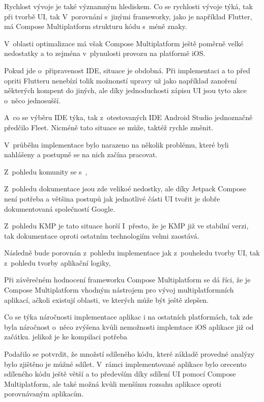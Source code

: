 Rychlost vývoje je také významným hlediskem. 
Co se rychlosti vývoje týká, tak při tvorbě UI, tak V~porovnání s~jinými frameworky, jako je například Flutter, má Compose Multiplatform strukturu kódu s~méně znaky.


V~oblasti optimalizace má však Compose Multiplatform ještě poměrně velké nedostatky a to zejména v~plynulosti provozu na 
platformě iOS.


Pokud jde o~připravenost IDE, situace je obdobná.  Při implementaci a to před
opriti Flutteru nenebízí tolik možnonstí upravy už jako  například zanoření některých kompent do jiných, ale díky jednoduchosti
zápisu UI jsou tyto akce o~něco jednosušší.

A~co se výběru IDE týka, tak z~otestovaných IDE Android Studio jednoznačně předčilo Fleet. Nicméně tato situace se může, 
taktéž rychle změnit.

V~průběhu implementace bylo narazeno na několik problému, které byli nahlášeny a postupně se na nich začína pracovat.

Z~pohledu komunity se s~,


Z~pohledu dokumentace jsou zde velikoé nedostky, ale díky Jetpack Compose není potřeba a většina postupů jak jednotlivé části 
UI tvořit je dobře dokumentovaná společností Google. 

Z~pohledu KMP je tato situace horší
I~přesto, že je KMP již ve stabilní verzi, tak dokumentace oproti ostatním technologiím velmi zaostává.



Následně bude porovnán z~pohledu implementace  jak z~pouheledu tvorby UI, tak z~pohledu tvorby aplikační logiky,



Při závěrečném hodnocení frameworku Compose Multiplatform se dá říci, že 
je Compose Multiplatform vhodným nástrojem pro vývoj multiplatformních aplikací, ačkoli existují oblasti, 
ve kterých může být ještě zlepšen.


Co se týka náročnosti implementace aplikac i na ostatních platformách, tak zde byla náročnost
o~něco zvýšena kvůli nemožnosti implemtace iOS aplikace již od začátku. jelikož je ke kompilaci potřeba 


Podařilo se potvrdit, že množstí sdíleného kódu, které základě provedné analýzy bylo zjištěno je můžné sdílet. V~rámci implementované aplikace
bylo orecento sdíleného kódu ještě větší a to především díky sdílení UI pomocí Compose Multiplatform, ale také možná kvůli menšímu rozsahu
aplikace oproti porovnávaným aplikacím. 


